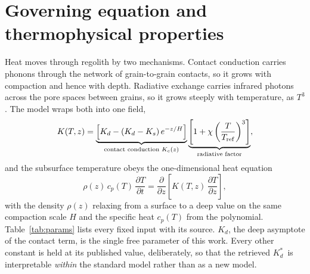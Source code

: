 \documentclass[11pt,a4paper,oneside]{report}
\newcommand{\Kd}{\ensuremath{K_d}}
\newcommand{\Kds}{\ensuremath{K_d^{*}}}
\newcommand{\Ks}{\ensuremath{K_s}}
\begin{document}
\section{Governing equation and thermophysical properties}
Heat moves through regolith by two mechanisms. Contact conduction
carries phonons through the network of grain-to-grain contacts, so it
grows with compaction and hence with depth. Radiative exchange carries
infrared photons across the pore spaces between grains, so it grows
steeply with temperature, as $T^3$. The \citet{hayne2017} model wraps
both into one field,
\begin{equation}
  K(T,z) = \underbrace{\left[\Kd - (\Kd-\Ks)\,
      e^{-z/H}\right]}_{\text{contact conduction } K_c(z)}
    \underbrace{\left[1+\chi\left(\frac{T}{T_{\rm ref}}\right)^{3}
      \right]}_{\text{radiative factor}},
  \label{eq:conductivity}
\end{equation}
and the subsurface temperature obeys the one-dimensional heat
equation
\begin{equation}
  \rho(z)\, c_p(T)\, \frac{\partial T}{\partial t}
  = \frac{\partial}{\partial z}\!\left[K(T,z)\,
    \frac{\partial T}{\partial z}\right],
  \label{eq:heat}
\end{equation}
with the density $\rho(z)$ relaxing from a surface to a deep value on
the same compaction scale $H$ and the specific heat $c_p(T)$ from the
\citet{hemingway1973} polynomial. Table~\ref{tab:params} lists every
fixed input with its source. \Kd, the deep asymptote of the contact
term, is the single free parameter of this work. Every other constant
is held at its published value, deliberately, so that the retrieved
\Kds\ is interpretable \emph{within} the standard model rather than as
a new model.
\end{document}
